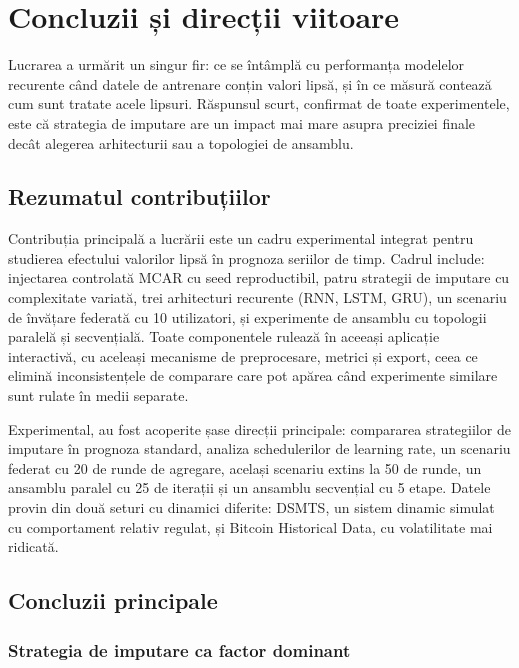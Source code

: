 \chapter{Concluzii și direcții viitoare}

Lucrarea a urmărit un singur fir: ce se întâmplă cu performanța modelelor recurente când datele de antrenare conțin valori lipsă, și în ce măsură contează cum sunt tratate acele lipsuri. Răspunsul scurt, confirmat de toate experimentele, este că strategia de imputare are un impact mai mare asupra preciziei finale decât alegerea arhitecturii sau a topologiei de ansamblu.

\section{Rezumatul contribuțiilor}

Contribuția principală a lucrării este un cadru experimental integrat pentru studierea efectului valorilor lipsă în prognoza seriilor de timp. Cadrul include: injectarea controlată MCAR cu seed reproductibil, patru strategii de imputare cu complexitate variată, trei arhitecturi recurente (RNN, LSTM, GRU), un scenariu de învățare federată cu 10 utilizatori, și experimente de ansamblu cu topologii paralelă și secvențială. Toate componentele rulează în aceeași aplicație interactivă, cu aceleași mecanisme de preprocesare, metrici și export, ceea ce elimină inconsistențele de comparare care pot apărea când experimente similare sunt rulate în medii separate.

Experimental, au fost acoperite șase direcții principale: compararea strategiilor de imputare în prognoza standard, analiza schedulerilor de learning rate, un scenariu federat cu 20 de runde de agregare, același scenariu extins la 50 de runde, un ansamblu paralel cu 25 de iterații și un ansamblu secvențial cu 5 etape. Datele provin din două seturi cu dinamici diferite: DSMTS, un sistem dinamic simulat cu comportament relativ regulat, și Bitcoin Historical Data, cu volatilitate mai ridicată.

\section{Concluzii principale}

\subsection{Strategia de imputare ca factor dominant}

